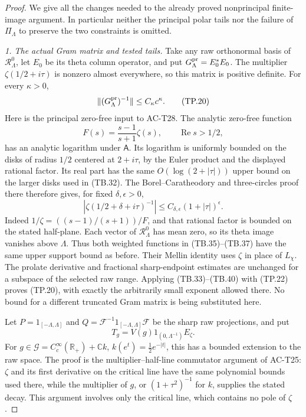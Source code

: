 \begin{proof}
We give all the changes needed to the already proved
nonprincipal finite-image argument.  In particular neither
the principal polar tails nor the failure of
\(\Pi_\Lambda\) to preserve the two constraints is omitted.

\emph{1. The actual Gram matrix and tested tails.}
Take any raw orthonormal basis of \(\mathcal R_\Lambda^0\),
let \(E_0\) be its theta column operator, and put
\(G_\Lambda^{\rm pr}=E_0^*E_0\).
The multiplier \(\zeta(1/2+i\tau)\) is nonzero almost
everywhere, so this matrix is positive definite.
For every \(\kappa>0\),
\[
        \|(G_\Lambda^{\rm pr})^{-1}\|
                              \leq C_\kappa c^\kappa .
 \tag{TP.20}
\]
Here is the principal zero-free input to AC-T28.
The analytic zero-free function
\[
              F(s)=\frac{s-1}{s+1}\zeta(s),
                       \qquad \operatorname{Re}s>1/2,
 \tag{TP.21}
\]
has an analytic logarithm under \(\mathsf A\).
Its logarithm is uniformly bounded on the disks of
radius \(1/2\) centered at \(2+i\tau\), by the
Euler product and the displayed rational factor.
Its real part has the same \(O(\log(2+|\tau|))\)
upper bound on the larger disks used in (TB.32).
The Borel--Caratheodory and three-circles proof there
therefore gives, for fixed \(\delta,\epsilon>0\),
\[
        |\zeta(1/2+\delta+i\tau)^{-1}|
                          \leq C_{\delta,\epsilon}
                                       (1+|\tau|)^\epsilon.
 \tag{TP.22}
\]
Indeed \(1/\zeta=((s-1)/(s+1))/F\), and that rational
factor is bounded on the stated half-plane.
Each vector of \(\mathcal R_\Lambda^0\) has mean zero,
so its theta image vanishes above \(\Lambda\).
Thus both weighted functions in (TB.35)--(TB.37)
have the same upper support bound as before.
Their Mellin identity uses \(\zeta\) in place of \(L_\chi\).
The prolate derivative and fractional sharp-endpoint
estimates are unchanged for a subspace of the selected
raw range.  Applying (TB.33)--(TB.40) with (TP.22)
proves (TP.20), with exactly the arbitrarily small
exponent allowed there.  No bound for a different
truncated Gram matrix is being substituted here.

Let \(P=1_{[-\Lambda,\Lambda]}\) and
\(Q=\mathcal F^{-1}1_{[-\Lambda,\Lambda]}\mathcal F\)
be the sharp raw projections, and put
\[
         T_g=V(g)1_{(0,\Lambda^{-1})}E_\zeta .
 \tag{TP.23}
\]
For \(g\in\mathscr G=C_c^\infty(\mathbb R_+)+\mathbb C k\),
\(k(e^t)=\tfrac12e^{-|t|}\), this has a bounded
extension to the raw space.
The proof is the multiplier--half-line commutator
argument of AC-T25: \(\zeta\) and its first derivative
on the critical line have the same polynomial bounds
used there, while the multiplier of \(g\), or
\((1+\tau^2)^{-1}\) for \(k\), supplies the stated
decay.  This argument involves only the critical
line, which contains no pole of \(\zeta\).


\end{proof}
